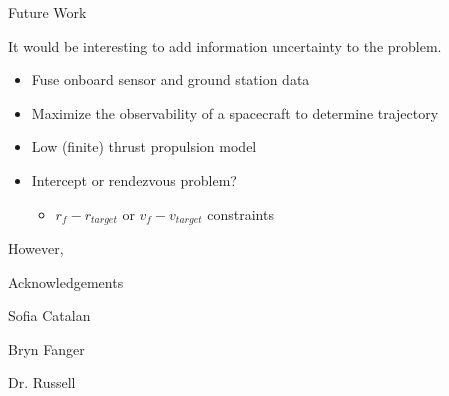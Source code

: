 \begin{frame}{Future Work} 

    It would be interesting to add information uncertainty to the problem. 
    \begin{itemize} 
        \item Fuse onboard sensor and ground station data 
        \item Maximize the observability of a spacecraft to determine trajectory 
        \item Low (finite) thrust propulsion model  
        \item Intercept or rendezvous problem? 
        \begin{itemize}
            \item $ r_f - r_{target} $ or $ v_f - v_{target} $ constraints 
        \end{itemize}
    \end{itemize} 
    
\end{frame}

\begin{frame}

    However, 
    
\end{frame}

\begin{frame}{Acknowledgements} 

    Sofia Catalan 
    
    Bryn Fanger 
    
    Dr. Russell 
    
\end{frame} 


